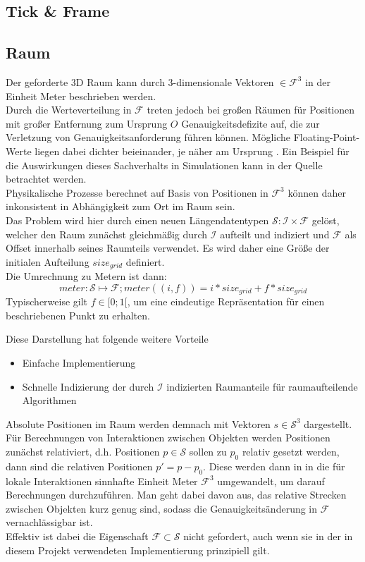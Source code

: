 \subsection{Tick \& Frame}


\subsection{Raum}
\label{sec:space}
Der geforderte 3D Raum kann durch 3-dimensionale Vektoren $\in \mathcal{F}^3$ in der Einheit Meter beschrieben werden.\\
Durch die Werteverteilung in $\mathcal{F}$ treten jedoch bei großen Räumen für Positionen mit großer Entfernung zum Ursprung $O$ Genauigkeitsdefizite auf, die zur Verletzung von Genauigkeitsanforderung führen können. Mögliche Floating-Point-Werte liegen dabei dichter beieinander, je näher am Ursprung \cite{floatdistribution}. Ein Beispiel für die Auswirkungen dieses Sachverhalts in Simulationen kann in der Quelle \cite{floatdistributionexample} betrachtet werden.\\
Physikalische Prozesse berechnet auf Basis von Positionen in $\mathcal{F}^3$ können daher inkonsistent in Abhängigkeit zum Ort im Raum sein.\\
Das Problem wird hier durch einen neuen Längendatentypen $\mathcal{S} : \mathcal{I} \times \mathcal{F}$ gelöst, welcher den Raum zunächst gleichmäßig durch $\mathcal{I}$ aufteilt und indiziert und $\mathcal{F}$ als Offset innerhalb seines Raumteils verwendet. Es wird daher eine Größe der initialen Aufteilung $size_{grid}$ definiert.\\
Die Umrechnung zu Metern ist dann: $$ meter: \mathcal{S} \mapsto \mathcal{F};  meter((i, f)) = i * size_{grid} + f * size_{grid}$$ 
Typischerweise gilt $f \in [0;1[$, um eine eindeutige Repräsentation für einen beschriebenen Punkt zu erhalten.

Diese Darstellung hat folgende weitere Vorteile
\begin{itemize}
\item Einfache Implementierung
\item Schnelle Indizierung der durch $\mathcal{I}$ indizierten Raumanteile für raumaufteilende Algorithmen
\end{itemize}

Absolute Positionen im Raum werden demnach mit Vektoren $s\in\mathcal{S}^3$ dargestellt. Für Berechnungen von Interaktionen zwischen Objekten werden Positionen zunächst relativiert, d.h. Positionen $p \in \mathcal{S}$ sollen zu $p_0$ relativ gesetzt werden, dann sind die relativen Positionen $p' = p - p_0$. Diese werden dann in in die für lokale Interaktionen sinnhafte  Einheit Meter $\mathcal{F}^3$ umgewandelt, um darauf Berechnungen durchzuführen. Man geht dabei davon aus, das relative Strecken zwischen Objekten kurz genug sind, sodass die Genauigkeitsänderung in $\mathcal{F}$ vernachlässigbar ist.\\
Effektiv ist dabei die Eigenschaft $\mathcal{F}\subset\mathcal{S}$ nicht gefordert, auch wenn sie in der in diesem Projekt verwendeten Implementierung prinzipiell gilt.

